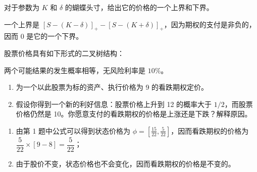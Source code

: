\begin{problem}
 对于参数为 $K$ 和 $\delta$ 的蝴蝶头寸，给出它的价格的一个上界和下界。
\end{problem}
\begin{solution}
一个上界是 $[S-(K-\delta)]_{+}-[S-(K+\delta)]_{+}$，因为期权的支付是非负的，因而 0 是它的一个下界。
\end{solution}

\begin{problem}
 股票价格具有如下形式的二叉树结构：
\begin{center}
\end{center}
两个可能结果的发生概率相等，无风险利率是 $10\%$。
\begin{enumerate}[label=(\alph*)]
    \item 为一个以此股票为标的资产、执行价格为 9 的看跌期权定价。
    \item 假设你得到一个新的利好信息：股票价格上升到 12 的概率大于 $1/2$，而股票价格仍然是 10。你愿意支付的看跌期权的价格是上涨还是下跌？解释原因。
\end{enumerate}
\end{problem}
\begin{solution}
\begin{enumerate}[label=(\alph*)]
    \item 由第 1 题中公式可以得到状态价格为 $\phi=[\tfrac{15}{22},\tfrac{5}{22}]$，因而看跌期权的价格为 $\dfrac{5}{22}\times[9-8]=\dfrac{5}{22}$；
    \item 由于股价不变，状态价格也不会变化，因而看跌期权的价格是不变的。
\end{enumerate}
\end{solution}

